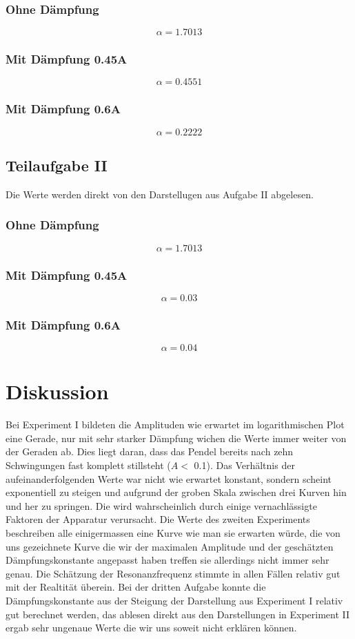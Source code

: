 \documentclass[12pt,a4paper]{article}
\begin{document}
\subsubsection*{Ohne D\"ampfung}
\[ \alpha = 1.7013 \]
\subsubsection*{Mit D\"ampfung 0.45A}
\[ \alpha = 0.4551 \]
\subsubsection*{Mit D\"ampfung 0.6A}
\[ \alpha = 0.2222 \]

\subsection*{Teilaufgabe II}
Die Werte werden direkt von den Darstellugen aus Aufgabe II abgelesen.
\subsubsection*{Ohne D\"ampfung}
\[ \alpha = 1.7013 \]
\subsubsection*{Mit D\"ampfung 0.45A}
\[ \alpha = 0.03 \]
\subsubsection*{Mit D\"ampfung 0.6A}
\[ \alpha = 0.04 \]

\section*{Diskussion}
Bei Experiment I bildeten die Amplituden wie erwartet im logarithmischen Plot eine Gerade, nur mit sehr starker D\"ampfung wichen die Werte immer weiter von der Geraden ab. Dies liegt daran, dass das Pendel bereits nach zehn Schwingungen fast komplett stillsteht ($A <$ 0.1). Das Verh\"altnis der aufeinanderfolgenden Werte war nicht wie erwartet konstant, sondern scheint exponentiell zu steigen und aufgrund der groben Skala zwischen drei Kurven hin und her zu springen. Die wird wahrscheinlich durch einige vernachl\"assigte Faktoren der Apparatur verursacht. Die Werte des zweiten Experiments beschreiben alle einigermassen eine Kurve wie man sie erwarten w\"urde, die von uns gezeichnete Kurve die wir der maximalen Amplitude und der gesch\"atzten D\"ampfungskonstante angepasst haben treffen sie allerdings nicht immer sehr genau. Die Sch\"atzung der Resonanzfrequenz stimmte in allen F\"allen relativ gut mit der Realtit\"at \"uberein. Bei der dritten Aufgabe konnte die D\"ampfungskonstante aus der Steigung der Darstellung aus Experiment I relativ gut berechnet werden, das ablesen direkt aus den Darstellungen in Experiment II ergab sehr ungenaue Werte die wir uns soweit nicht erkl\"aren k\"onnen.
\end{document}
